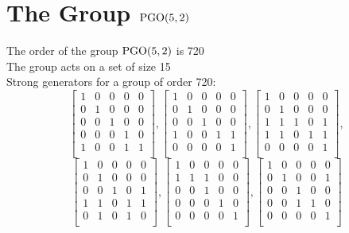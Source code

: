 \section*{The Group ${\rm PGO}(5,2)$}
\noindent The order of the group ${\rm PGO}(5,2)$ is 720\\
\noindent The group acts on a set of size 15\\
Strong generators for a group of order 720:
$$
\left[
\begin{array}{*{5}{r}}
1 & 0 & 0 & 0 & 0\\
0 & 1 & 0 & 0 & 0\\
0 & 0 & 1 & 0 & 0\\
0 & 0 & 0 & 1 & 0\\
1 & 0 & 0 & 1 & 1\\
\end{array}
\right]
, 
\left[
\begin{array}{*{5}{r}}
1 & 0 & 0 & 0 & 0\\
0 & 1 & 0 & 0 & 0\\
0 & 0 & 1 & 0 & 0\\
1 & 0 & 0 & 1 & 1\\
0 & 0 & 0 & 0 & 1\\
\end{array}
\right]
, 
\left[
\begin{array}{*{5}{r}}
1 & 0 & 0 & 0 & 0\\
0 & 1 & 0 & 0 & 0\\
1 & 1 & 1 & 0 & 1\\
1 & 1 & 0 & 1 & 1\\
0 & 0 & 0 & 0 & 1\\
\end{array}
\right]
, 
$$
$$
\left[
\begin{array}{*{5}{r}}
1 & 0 & 0 & 0 & 0\\
0 & 1 & 0 & 0 & 0\\
0 & 0 & 1 & 0 & 1\\
1 & 1 & 0 & 1 & 1\\
0 & 1 & 0 & 1 & 0\\
\end{array}
\right]
, 
\left[
\begin{array}{*{5}{r}}
1 & 0 & 0 & 0 & 0\\
1 & 1 & 1 & 0 & 0\\
0 & 0 & 1 & 0 & 0\\
0 & 0 & 0 & 1 & 0\\
0 & 0 & 0 & 0 & 1\\
\end{array}
\right]
, 
\left[
\begin{array}{*{5}{r}}
1 & 0 & 0 & 0 & 0\\
0 & 1 & 0 & 0 & 1\\
0 & 0 & 1 & 0 & 0\\
0 & 0 & 1 & 1 & 0\\
0 & 0 & 0 & 0 & 1\\
\end{array}
\right]
$$
